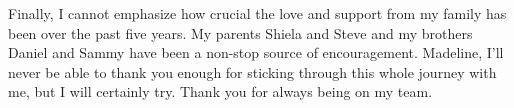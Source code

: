 \documentclass[12pt]{book}
\begin{document}
Finally, I cannot emphasize how crucial the love and support from my family
has been over the past five years. My parents Shiela and Steve and my brothers
Daniel and Sammy have been a non-stop source of encouragement.
Madeline, I'll never be able to thank you enough for sticking through this whole
journey with me, but I will certainly try. Thank you for always being on my team.


\clearpage

\pagestyle{headings}
\setcounter{page}{1}
\renewcommand{\chaptermark}[1]{\markboth{\sc{\chaptername\ \thechapter.\ #1}}{}}
\renewcommand{\sectionmark}[1]{\markright{\sc{\thesection.\ #1}}{}}





\clearpage
{}
\singlespacing


\end{document}

